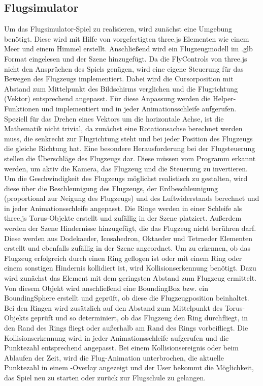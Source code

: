 \subsection{Flugsimulator}

Um das Flugsimulator-Spiel zu realisieren, wird zunächst eine Umgebung benötigt.
Diese wird mit Hilfe von vorgefertigten three.js Elementen wie einem Meer und einem Himmel erstellt.
Anschließend wird ein Flugzeugmodell im .glb Format eingelesen und der Szene hinzugefügt.
\newparagraph
Da die FlyControls von three.js nicht den Ansprüchen des Spiels genügen, wird eine eigene Steuerung für das Bewegen des Flugzeugs implementiert.
Dabei wird die Cursorposition mit Abstand zum Mittelpunkt des Bildschirms verglichen und die Flugrichtung (Vektor) entsprechend angepasst.
Für diese Anpassung werden die Helper-Funktionen  und  implementiert und in jeder Animationsschleife aufgerufen.
Speziell für das Drehen eines Vektors um die horizontale Achse, ist die Mathematik nicht trivial, da zunächst eine Rotationsachse berechnet werden muss, die senkrecht zur Flugrichtung steht und bei jeder Position des Flugzeugs die gleiche Richtung hat.
Eine besondere Herausforderung bei der Flugsteuerung stellen die Überschläge des Flugzeugs dar.
Diese müssen vom Programm erkannt werden, um aktiv die Kamera, das Flugzeug und die Steuerung zu invertieren.
Um die Geschwindigkeit des Flugzeugs möglichst realistisch zu gestalten, wird diese über die Beschleunigung des Flugzeugs, der Erdbeschleunigung (proportional zur Neigung des Flugzeugs) und des Luftwiderstands berechnet und in jeder Animationsschleife angepasst.
\newparagraph
Die Ringe werden in einer Schleife als three.js Torus-Objekte erstellt und zufällig in der Szene platziert.
Außerdem werden der Szene Hindernisse hinzugefügt, die das Flugzeug nicht berühren darf.
Diese werden aus Dodekaeder, Icosahedron, Oktaeder und Tetraeder Elementen erstellt und ebenfalls zufällig in der Szene angeordnet.
\newparagraph
Um zu erkennen, ob das Flugzeug erfolgreich durch einen Ring geflogen ist oder mit einem Ring oder einem sonstigen Hindernis kollidiert ist, wird Kollisionserkennung benötigt.
Dazu wird zunächst das Element mit dem geringsten Abstand zum Flugzeug ermittelt.
Von diesem Objekt wird anschließend eine BoundingBox bzw. ein BoundingSphere erstellt und geprüft, ob diese die Flugzeugposition beinhaltet.
Bei den Ringen wird zusätzlich auf den Abstand zum Mittelpunkt des Torus-Objekts geprüft und so determiniert, ob das Flugzeug den Ring durchfliegt, in den Rand des Rings fliegt oder außerhalb am Rand des Rings vorbeifliegt.
Die Kollisionserkennung wird in jeder Animationsschleife aufgerufen und die Punktezahl entsprechend angepasst.
Bei einem Kollisionsereignis oder beim Ablaufen der Zeit, wird die Flug-Animation unterbrochen, die aktuelle Punktezahl in einem -Overlay angezeigt und der User bekommt die Möglichkeit, das Spiel neu zu starten oder zurück zur Flugschule zu gelangen.

